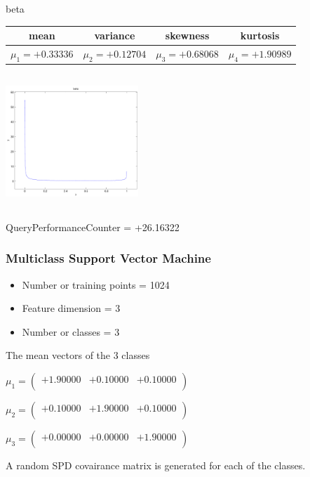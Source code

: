 \documentclass[9pt]{article}
\theoremstyle{plain}
\theoremstyle{definition}
\theoremstyle{remark}
\numberwithin{equation}{section}
\begin{document}
\newpage
beta \begin{tabular}{|c|c|c|c|}  mean & variance & skewness & kurtosis \\  \hline
$\mu_1 = +0.33336$ & $\mu_2 = +0.12704$ & $\mu_3 = +0.68068$ & $\mu_4 =+1.90989$ \\
\end{tabular}

\includegraphics[width=5cm,height=5cm]{beta.pdf}

QueryPerformanceCounter  =  +26.16322
\subsubsection{Multiclass Support Vector Machine }
\begin{itemize}
\item Number or training points = 1024
\item Feature dimension = 3
\item Number or classes = 3
\end{itemize}
{The mean vectors of the 3 classes}

$\mu_1 = \left(
\begin{array}{
ccc}
+1.90000 & +0.10000 & +0.10000 \\
\end{array}
\right)$ \newline 

$\mu_2 = \left(
\begin{array}{
ccc}
+0.10000 & +1.90000 & +0.10000 \\
\end{array}
\right)$ \newline 

$\mu_3 = \left(
\begin{array}{
ccc}
+0.00000 & +0.00000 & +1.90000 \\
\end{array}
\right)$ \newline 

A random SPD covairance matrix is generated for each of the classes.\newline
\end{document}
